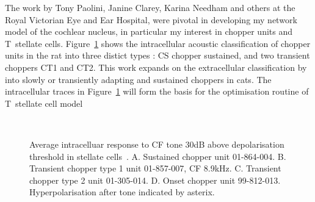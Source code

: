 


The work by Tony Paolini, Janine Clarey, Karina Needham and others at the Royal
Victorian Eye and Ear Hospital, were pivotal in developing my network model of
the cochlear nucleus, in particular my interest in chopper units and T~stellate
cells.  Figure~\ref{fig:PaoliniAIV} shows the intracellular acoustic
classification of chopper units in the rat into three distict types
\citep{PaoliniClareyEtAl:2005}: CS chopper sustained, and two transient choppers
CT1 and CT2.  This work expands on the extracellular classification by
\citep{BlackburnSachs:1989} into slowly or transiently adapting and sustained
choppers in cats. The intracellular traces in Figure~\ref{fig:PaoliniAIV} will
form the basis for the optimisation routine of T~stellate cell model


\begin{figure}[htb]
  \centering
{}\quad%
\\
\quad%
\caption[Average intracelluar response data in stellate cells in rats.]{Average
  intracelluar response to CF tone 30dB above depolarisation threshold in
  stellate
  cells~\citep[Reproduced~from~][]{PaoliniClareyEtAl:2005}. A. Sustained chopper
  unit 01-864-004. B. Transient chopper type 1 unit 01-857-007, CF 8.9kHz. C. Transient
  chopper type 2 unit 01-305-014. D. Onset chopper unit
  99-812-013. Hyperpolarisation after tone indicated by
  asterix.  \label{fig:PaoliniAIV}}
\end{figure}




